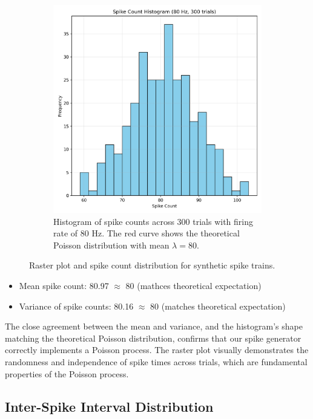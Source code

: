 \documentclass{article}
\begin{document}
\begin{figure}[H]
\begin{subfigure}{0.48\textwidth}
    \includegraphics[width=\textwidth]{Fig2b.png}
    \caption{Histogram of spike counts across 300 trials with firing rate of 80 Hz. The red curve shows the theoretical Poisson distribution with mean $\lambda = 80$.}
    \label{fig:spike_count_hist}
\end{subfigure}
\caption{Raster plot and spike count distribution for synthetic spike trains.}
\end{figure}

\begin{itemize}
\item Mean spike count: 80.97 $\approx$ 80 (mathces theoretical expectation)
\item Variance of spike counts: 80.16 $\approx$ 80 (matches theoretical expectation)
\end{itemize}


The close agreement between the mean and variance, and the histogram's shape matching the theoretical Poisson distribution, confirms that our spike generator correctly implements a Poisson process. 
The raster plot visually demonstrates the randomness and independence of spike times across trials, which are fundamental properties of the Poisson process.

\subsection{Inter-Spike Interval Distribution}
\end{document}
